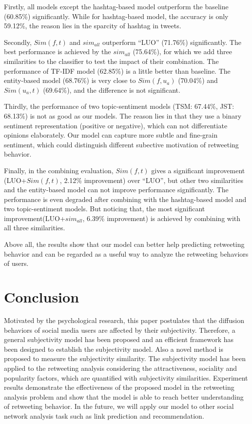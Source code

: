 Firstly, all models except the hashtag-based model outperform the baseline (60.85\%) significantly. While for hashtag-based model, the accuracy is only 59.12\%, the reason lies in the sparcity of hashtag in tweets. 

Secondly, $ Sim(f,t) $ and $ sim_{all}  $ outperform ``LUO'' (71.76\%) significantly.
The best performance is achieved by the $ sim_{all}  $ (75.64\%), for which we add three similarities to the classifier to test the impact of their combination. 
The performance of TF-IDF model (62.85\%) is a little better than baseline. 
The entity-based model (68.76\%) is very close to  $ Sim(f,u_a)$ (70.04\%) and $ Sim(u_a,t)  $ (69.64\%), and the difference is not significant.

Thirdly, the performance of two topic-sentiment models (TSM: 67.44\%, JST: 68.13\%) is not as good as our models. The reason lies in that they use a binary sentiment representation (positive or negative), which can not differentiate opinions elaborately. Our model can capture more subtle and fine-grain sentiment, which could distinguish different subective motivation of retweeting behavior.

Finally, in the combining evaluation, $ Sim(f,t) $ gives a significant improvement (LUO+$ Sim(f,t) $, 2.12\% improvement) over ``LUO'', but other two similarities and the entity-based model can not improve performance significantly. The performance is even degraded after combining with the hashtag-based model and two topic-sentiment models. 
But noticing that, the most significant improvement(LUO+$ sim_{all}  $, 6.39\% improvement) is achieved by combining with all three similarities. 

Above all, the results show that our model can better help predicting retweeting behavior and can be regarded as a useful way to analyze the retweeting behaviors of users. 

\section{Conclusion}
Motivated by the psychological research, this paper postulates that the diffusion behaviors of social media users are affected by their subjectivity. Therefore, a general subjectivity model has been proposed and an efficient framework has been designed to establish the subjectivity model. Also a novel method is proposed to measure the subjectivity similarity. The subjectivity model has been applied to the retweeting analysis considering the attractiveness, sociality and popularity factors, which are quantified with subjectivity similarities. 
Experiment results demonstrate the effectiveness of the proposed model in the retweeting analysis problem and show that the model is able to reach better understanding of retweeting behavior. 
In the future, we will apply our model to other social network analysis task such as link prediction and recommendation. 

